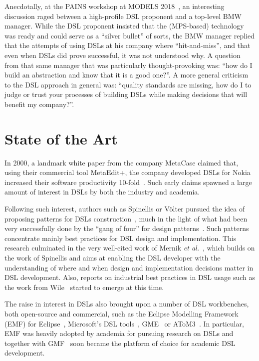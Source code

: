 \documentclass{scrartcl}
\begin{document}
Anecdotally, at the PAINS workshop at MODELS 2018~\cite{pains18}, an interesting
discussion raged between a high-profile DSL proponent and a top-level BMW manager. While
the DSL proponent insisted that the (MPS-based) technology was ready and could
serve as a ``silver bullet'' of sorts, the BMW manager replied that the attempts of using
DSLs at his company where ``hit-and-miss'', and that even when DSLs did prove
successful, it was not understood why. A question from that same manager that
was particularly thought-provoking was: ``how do I build an abstraction and
know that it is a good one?''. A more general criticism to the DSL approach in
general was: ``quality standards are missing, how do I to judge or trust your
processes of building DSLs while making decisions that will benefit my company?''.
 
\section{State of the Art}
\label{sec:soa}

In 2000, a landmark white paper from the company MetaCase
claimed that, using their commercial tool MetaEdit+, the company developed DSLs
for Nokia increased their software productivity 10-fold~\cite{metacase00}.
Such early claims spawned a large amount of interest in DSLs by both the
industry and academia.

Following such interest, authors such as Spinellis or V\"olter pursued the idea
of proposing patterns for DSLs construction~\cite{Spinellis01,VolterB04}, much
in the light of what had been very successfully done by the ``gang of four'' for
design patterns~\cite{Gamma:95}. Such patterns concentrate mainly best practices
for DSL design and implementation. This research culminated in the very
well-cited work of Mernik \emph{et al.}~\cite{MernikHS05}, which builds on the
work of Spinellis and aims at enabling the DSL developer with the understanding of
where and when design and implementation decisions matter in DSL development.
Also, reports on industrial best practices in DSL usage such as the work from
Wile~\cite{Wile03} started to emerge at this time.

The raise in interest in DSLs also brought upon a number of DSL workbenches,
both open-source and commercial, such as the Eclipse Modelling Framework
(EMF) for Eclipse~\cite{emf}, Microsoft's DSL tools~\cite{microsoftDSLTools},
GME~\cite{gme} or AToM3~\cite{atom3}. In particular, EMF was heavily adopted by
academia for pursuing research on DSLs and together with GMF~\cite{gmf} soon
became the platform of choice for academic DSL development.
 
\end{document}
